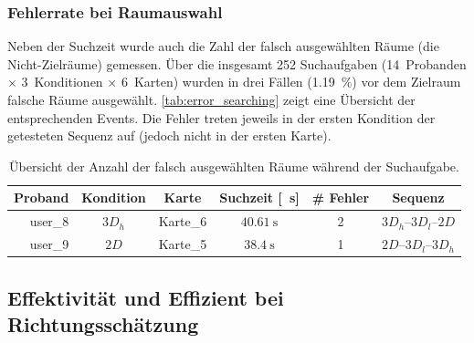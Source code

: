 \subsubsection*{Fehlerrate bei Raumauswahl}
Neben der Suchzeit wurde auch die Zahl der falsch ausgewählten Räume (die Nicht-Zielräume) gemessen.
Über die insgesamt 252 Suchaufgaben (14~Probanden $\times$ 3~Konditionen $\times$ 6~Karten) wurden in drei Fällen (\SI{1,19}{\percent}) vor dem Zielraum falsche Räume ausgewählt.
\autoref{tab:error_searching} zeigt eine Übersicht der entsprechenden Events.
Die Fehler treten jeweils in der ersten Kondition der getesteten Sequenz auf (jedoch nicht in der ersten Karte).
\begin{table}
    \centering
    \caption{Übersicht der Anzahl der falsch ausgewählten Räume während der Suchaufgabe.}
    \label{tab:error_searching}
    \begin{tabular}{rccccc}\toprule
        Proband                  & Kondition               & Karte    & Suchzeit [\SI{}{\second}] & \# Fehler & Sequenz  \\\midrule
        user\_8                  & $3D_h$                  & Karte\_6 & $\SI{40,61}{\second}$     & 2         & $3D_h$--$3D_l$--$2D$ \\
        user\_9                  & $2D$                    & Karte\_5 & $\SI{38,4}{\second}$      & 1         & $2D$--$3D_l$--$3D_h$ \\\bottomrule
    \end{tabular}
\end{table}

\subsection{Effektivität und Effizient bei Richtungsschätzung}
